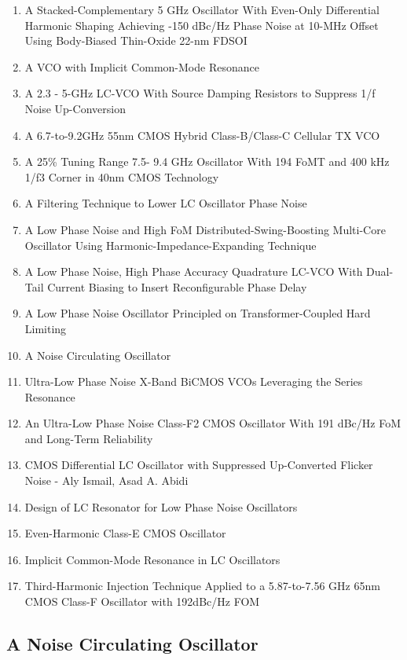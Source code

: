 \documentclass{article}
\begin{document}
\begin{enumerate}
	\item A Stacked-Complementary 5 GHz Oscillator With Even-Only Differential Harmonic Shaping Achieving -150 dBc/Hz Phase Noise at 10-MHz Offset Using Body-Biased Thin-Oxide 22-nm FDSOI
	\item A VCO with Implicit Common-Mode Resonance
	\item A 2.3 - 5-GHz LC-VCO With Source Damping Resistors to Suppress 1/f Noise Up-Conversion
	\item A 6.7-to-9.2GHz 55nm CMOS Hybrid Class-B/Class-C Cellular TX VCO
	\item A 25\% Tuning Range 7.5- 9.4 GHz Oscillator With 194 FoMT and 400 kHz 1/f3 Corner in 40nm CMOS Technology
	\item A Filtering Technique to Lower LC Oscillator Phase Noise
	\item A Low Phase Noise and High FoM Distributed-Swing-Boosting Multi-Core Oscillator Using Harmonic-Impedance-Expanding Technique
	\item A Low Phase Noise, High Phase Accuracy Quadrature LC-VCO With Dual-Tail Current Biasing to Insert Reconfigurable Phase Delay
	\item A Low Phase Noise Oscillator Principled on Transformer-Coupled Hard Limiting
	\item A Noise Circulating Oscillator
	\item Ultra-Low Phase Noise X-Band BiCMOS VCOs Leveraging the Series Resonance
	\item An Ultra-Low Phase Noise Class-F2 CMOS Oscillator With 191 dBc/Hz FoM and Long-Term Reliability
	\item CMOS Differential LC Oscillator with Suppressed Up-Converted Flicker Noise - Aly Ismail, Asad A. Abidi
	\item Design of LC Resonator for Low Phase Noise Oscillators
	\item Even-Harmonic Class-E CMOS Oscillator
	\item Implicit Common-Mode Resonance in LC Oscillators
	\item Third-Harmonic Injection Technique Applied to a 5.87-to-7.56 GHz 65nm CMOS Class-F Oscillator with 192dBc/Hz FOM
\end{enumerate}

\newpage

\subsection{A Noise Circulating Oscillator}
\end{document}
